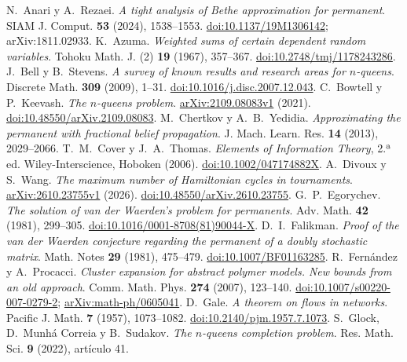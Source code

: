 N.~Anari y A.~Rezaei.
\emph{A tight analysis of Bethe approximation for permanent}.
SIAM J. Comput. \textbf{53} (2024), 1538--1553.
\href{https://doi.org/10.1137/19M1306142}{doi:10.1137/19M1306142}; arXiv:1811.02933.
K.~Azuma.
\emph{Weighted sums of certain dependent random variables}.
Tohoku Math. J. (2) \textbf{19} (1967), 357--367.
\href{https://doi.org/10.2748/tmj/1178243286}{doi:10.2748/tmj/1178243286}.
J.~Bell y B.~Stevens.
\emph{A survey of known results and research areas for $n$-queens}.
Discrete Math. \textbf{309} (2009), 1--31.
\href{https://doi.org/10.1016/j.disc.2007.12.043}{doi:10.1016/j.disc.2007.12.043}.
C.~Bowtell y P.~Keevash.
\emph{The $n$-queens problem}.
\href{https://arxiv.org/abs/2109.08083v1}{arXiv:2109.08083v1} (2021).
\href{https://doi.org/10.48550/arXiv.2109.08083}{doi:10.48550/arXiv.2109.08083}.
M.~Chertkov y A.~B.~Yedidia.
\emph{Approximating the permanent with fractional belief propagation}.
J. Mach. Learn. Res. \textbf{14} (2013), 2029--2066.
T.~M.~Cover y J.~A.~Thomas.
\emph{Elements of Information Theory}, 2.ª ed.
Wiley-Interscience, Hoboken (2006).
\href{https://doi.org/10.1002/047174882X}{doi:10.1002/047174882X}.
A.~Divoux y S.~Wang.
\emph{The maximum number of Hamiltonian cycles in tournaments}.
\href{https://arxiv.org/abs/2610.23755v1}{arXiv:2610.23755v1} (2026).
\href{https://doi.org/10.48550/arXiv.2610.23755}{doi:10.48550/arXiv.2610.23755}.
G.~P.~Egorychev.
\emph{The solution of van der Waerden's problem for permanents}.
Adv. Math. \textbf{42} (1981), 299--305.
\href{https://doi.org/10.1016/0001-8708(81)90044-X}{doi:10.1016/0001-8708(81)90044-X}.
D.~I.~Falikman.
\emph{Proof of the van der Waerden conjecture regarding the permanent of a doubly stochastic matrix}.
Math. Notes \textbf{29} (1981), 475--479.
\href{https://doi.org/10.1007/BF01163285}{doi:10.1007/BF01163285}.
R.~Fernández y A.~Procacci.
\emph{Cluster expansion for abstract polymer models. New bounds from an old approach}.
Comm. Math. Phys. \textbf{274} (2007), 123--140.
\href{https://doi.org/10.1007/s00220-007-0279-2}{doi:10.1007/s00220-007-0279-2};
\href{https://doi.org/10.48550/arXiv.math-ph/0605041}{arXiv:math-ph/0605041}.
D.~Gale.
\emph{A theorem on flows in networks}.
Pacific J. Math. \textbf{7} (1957), 1073--1082.
\href{https://doi.org/10.2140/pjm.1957.7.1073}{doi:10.2140/pjm.1957.7.1073}.
S.~Glock, D.~Munhá Correia y B.~Sudakov.
\emph{The $n$-queens completion problem}.
Res. Math. Sci. \textbf{9} (2022), artículo 41.
